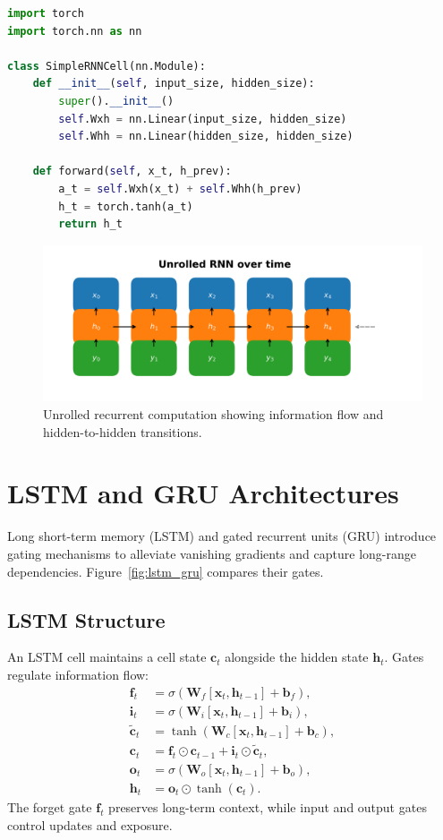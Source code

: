 ﻿\documentclass[12pt]{article}
\begin{document}
\begin{lstlisting}[language=Python, caption={PyTorch Elman RNN cell with gated recurrent unit interface.}]
import torch
import torch.nn as nn

class SimpleRNNCell(nn.Module):
    def __init__(self, input_size, hidden_size):
        super().__init__()
        self.Wxh = nn.Linear(input_size, hidden_size)
        self.Whh = nn.Linear(hidden_size, hidden_size)

    def forward(self, x_t, h_prev):
        a_t = self.Wxh(x_t) + self.Whh(h_prev)
        h_t = torch.tanh(a_t)
        return h_t
\end{lstlisting}

\begin{figure}[H]
  \centering
  \includegraphics[width=0.85\linewidth]{rnn_unrolled_dynamics.png}
  \caption{Unrolled recurrent computation showing information flow and hidden-to-hidden transitions.}
  \label{fig:rnn_unrolled}
\end{figure}
\FloatBarrier

\section{LSTM and GRU Architectures}
Long short-term memory (LSTM) and gated recurrent units (GRU) introduce gating mechanisms to alleviate vanishing gradients and capture long-range dependencies. Figure~\ref{fig:lstm_gru} compares their gates.

\subsection{LSTM Structure}
An LSTM cell maintains a cell state $\mathbf{c}_t$ alongside the hidden state $\mathbf{h}_t$. Gates regulate information flow:
\begin{align}
  \mathbf{f}_t &= \sigma(\mathbf{W}_f [\mathbf{x}_t, \mathbf{h}_{t-1}] + \mathbf{b}_f), \\
  \mathbf{i}_t &= \sigma(\mathbf{W}_i [\mathbf{x}_t, \mathbf{h}_{t-1}] + \mathbf{b}_i), \\
  \tilde{\mathbf{c}}_t &= \tanh(\mathbf{W}_c [\mathbf{x}_t, \mathbf{h}_{t-1}] + \mathbf{b}_c), \\
  \mathbf{c}_t &= \mathbf{f}_t \odot \mathbf{c}_{t-1} + \mathbf{i}_t \odot \tilde{\mathbf{c}}_t, \\
  \mathbf{o}_t &= \sigma(\mathbf{W}_o [\mathbf{x}_t, \mathbf{h}_{t-1}] + \mathbf{b}_o), \\
  \mathbf{h}_t &= \mathbf{o}_t \odot \tanh(\mathbf{c}_t).
\end{align}
The forget gate $\mathbf{f}_t$ preserves long-term context, while input and output gates control updates and exposure.
\end{document}
